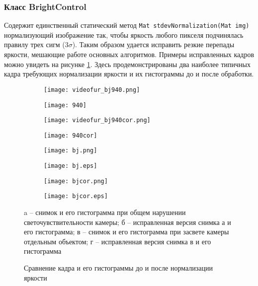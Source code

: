 \subsubsection{Класс BrightControl~}
Содержит единственный статический метод \texttt{Mat stdevNormalization(Mat img)} нормализующий изображение так, чтобы яркость любого пикселя подчинялась правилу трех сигм ($3\sigma$). Таким образом удается исправить резкие перепады яркости, мешающие работе основных алгоритмов. 
Примеры исправленных кадров можно увидеть на рисунке \ref{fig:bc}. Здесь продемонстрированы два наиболее типичных кадра требующих нормализации яркости и их гистограммы до и после обработки.
\begin{figure}
    \centering
    \begin{subfigure}{\textwidth}  
        \centering
        \texttt{[image: videofur\_bj940.png]}
    \end{subfigure}
    \begin{subfigure}{\textwidth}  
        \centering
        \texttt{[image: 940]}
        \caption{}
    \end{subfigure}
    \begin{subfigure}{\textwidth}  
        \centering
        \texttt{[image: videofur\_bj940cor.png]}
    \end{subfigure}
    \begin{subfigure}{\textwidth}  
        \centering
        \texttt{[image: 940cor]}
        \caption{}
    \end{subfigure}
    \begin{subfigure}{\textwidth}  
        \centering
        \texttt{[image: bj.png]}
    \end{subfigure}
    \begin{subfigure}{\textwidth}  
        \centering
        \texttt{[image: bj.eps]}
        \caption{}
    \end{subfigure}
    \begin{subfigure}{\textwidth}  
        \centering
        \texttt{[image: bjcor.png]}
    \end{subfigure}
    \begin{subfigure}{\textwidth}  
        \centering
        \texttt{[image: bjcor.eps]}
        \caption{}
    \end{subfigure}
    \label{fig:bc}
\begin{center}
    a -- снимок и его гистограмма при общем нарушении светочувствительности камеры; б -- исправленная версия снимка а  и его гистограмма; в -- снимок и его гистограмма при засвете камеры отдельным объектом; г -- исправленная версия снимка в и его гистограмма
\end{center}
    \caption{Сравнение кадра и его гистограммы до и после нормализации яркости}
\end{figure}
